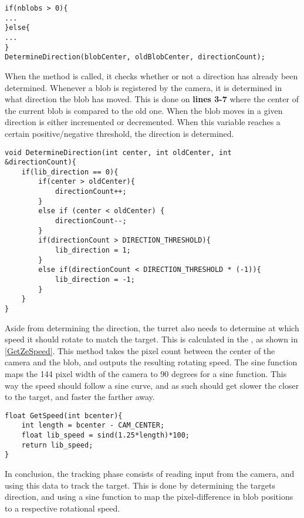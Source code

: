 \begin{minipage}[H]{\linewidth}
\begin{lstlisting}[caption = Call DetermineDirection., label = TrackDir]
if(nblobs > 0){
...
}else{
...
}
DetermineDirection(blobCenter, oldBlobCenter, directionCount);
\end{lstlisting}
\end{minipage}

When the  method is called, it checks
whether or not a direction has already been determined. Whenever a blob is
registered by the camera, it is determined in what direction the blob has
moved. This is done on \textbf{lines 3-7} where the center of the
current blob is compared to the old one. When the blob moves in a given
direction  is either incremented or decremented.
When this variable reaches a certain positive/negative threshold, the direction
is determined.\nl

\begin{minipage}[H]{\linewidth}
\begin{lstlisting}[caption = Determine the targets direction., label = DeterDir]
void DetermineDirection(int center, int oldCenter, int &directionCount){
	if(lib_direction == 0){
		if(center > oldCenter){
    		directionCount++;
		}
    	else if (center < oldCenter) {
    		directionCount--;
   		}
    	if(directionCount > DIRECTION_THRESHOLD){
    		lib_direction = 1;
    	}
    	else if(directionCount < DIRECTION_THRESHOLD * (-1)){
    		lib_direction = -1;
    	}
    }
}
\end{lstlisting}
\end{minipage}

Aside from determining the direction, the turret also needs to determine at
which speed it should rotate to match the target. This is calculated in the
, as shown in \autoref{GetZeSpeed}. This method
takes the pixel count between the center of the camera and the blob, and outputs
the resulting rotating speed. The sine function maps the 144 pixel width of the
camera to 90 degrees for a sine function. This way the speed should follow a
sine curve, and as such should get slower the closer to the target, and faster
the farther away.\nl

\begin{minipage}[H]{\linewidth}
\begin{lstlisting}[caption = Determine speed to rotate using a sine function, label = GetZeSpeed] 
float GetSpeed(int bcenter){
    int length = bcenter - CAM_CENTER;
    float lib_speed = sind(1.25*length)*100;
    return lib_speed;
}
\end{lstlisting}
\end{minipage}

In conclusion, the tracking phase consists of reading input from the camera, and
using this data to track the target. This is done by determining the targets
direction, and using a sine function to map the pixel-difference in blob
positions to a respective rotational speed.